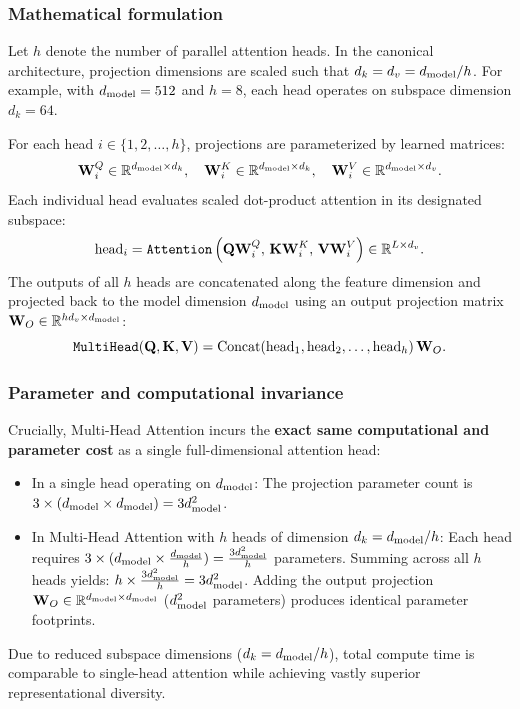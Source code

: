 \documentclass[../../main.tex]{subfiles}
\begin{document}
\subsubsection{Mathematical formulation}
Let $h$ denote the number of parallel attention heads. In the canonical architecture, projection dimensions are scaled such that $d_k = d_v = d_{\text{model}} / h$. For example, with $d_{\text{model}} = 512$ and $h = 8$, each head operates on subspace dimension $d_k = 64$.

For each head $i \in \{1, 2, \dots, h\}$, projections are parameterized by learned matrices:
\begin{equation}
\label{eq:mha_head_matrices}
\mathbf{W}_i^Q \in \mathbb{R}^{d_{\text{model}} \times d_k}, \quad \mathbf{W}_i^K \in \mathbb{R}^{d_{\text{model}} \times d_k}, \quad \mathbf{W}_i^V \in \mathbb{R}^{d_{\text{model}} \times d_v}.
\end{equation}
Each individual head evaluates scaled dot-product attention in its designated subspace:
\begin{equation}
\label{eq:mha_head_i_def}
\text{head}_i = \text{\texttt{Attention}}\left( \mathbf{Q} \mathbf{W}_i^Q, \, \mathbf{K} \mathbf{W}_i^K, \, \mathbf{V} \mathbf{W}_i^V \right) \in \mathbb{R}^{L \times d_v}.
\end{equation}
The outputs of all $h$ heads are concatenated along the feature dimension and projected back to the model dimension $d_{\text{model}}$ using an output projection matrix $\mathbf{W}_O \in \mathbb{R}^{h d_v \times d_{\text{model}}}$:
\begin{equation}
\label{eq:mha_concat_projection}
\text{\texttt{MultiHead}}(\mathbf{Q}, \mathbf{K}, \mathbf{V}) = \text{Concat}(\text{head}_1, \text{head}_2, \dots, \text{head}_h) \, \mathbf{W}_O.
\end{equation}

\subsubsection{Parameter and computational invariance}
Crucially, Multi-Head Attention incurs the \textbf{exact same computational and parameter cost} as a single full-dimensional attention head:
\begin{itemize}
    \item In a single head operating on $d_{\text{model}}$:
    The projection parameter count is $3 \times (d_{\text{model}} \times d_{\text{model}}) = 3 d_{\text{model}}^2$.
    \item In Multi-Head Attention with $h$ heads of dimension $d_k = d_{\text{model}} / h$:
    Each head requires $3 \times (d_{\text{model}} \times \frac{d_{\text{model}}}{h}) = \frac{3 d_{\text{model}}^2}{h}$ parameters.
    Summing across all $h$ heads yields: $h \times \frac{3 d_{\text{model}}^2}{h} = 3 d_{\text{model}}^2$.
    Adding the output projection $\mathbf{W}_O \in \mathbb{R}^{d_{\text{model}} \times d_{\text{model}}}$ ($d_{\text{model}}^2$ parameters) produces identical parameter footprints.
\end{itemize}
Due to reduced subspace dimensions ($d_k = d_{\text{model}} / h$), total compute time is comparable to single-head attention while achieving vastly superior representational diversity.
\end{document}
